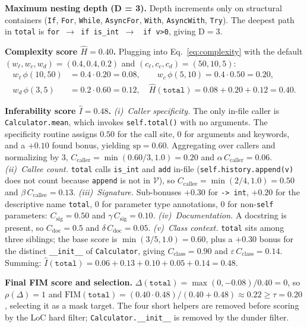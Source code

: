 \textbf{Maximum nesting depth (D = 3).}
Depth increments only on structural containers (\texttt{If},
\texttt{For}, \texttt{While}, \texttt{AsyncFor}, \texttt{With},
\texttt{AsyncWith}, \texttt{Try}). The deepest path in
\texttt{total} is \texttt{for}~$\to$~\texttt{if is\_int}~$\to$~%
\texttt{if v>0}, giving $\mathrm{D}=3$.

\textbf{Complexity score $\hat{H}=0.40$.}
Plugging into Eq.~\ref{eq:complexity} with the default
$(w_{\ell},w_{c},w_{d})=(0.4,0.4,0.2)$ and
$(c_{\ell},c_{c},c_{d})=(50,10,5)$:
\begin{align*}
w_{\ell}\,\phi(10,50) &= 0.4\!\cdot\!0.20 = 0.08, \qquad
w_{c}\,\phi(5,10)     = 0.4\!\cdot\!0.50 = 0.20, \\
w_{d}\,\phi(3,5)      &= 0.2\!\cdot\!0.60 = 0.12, \quad
\hat{H}(\texttt{total}) = 0.08+0.20+0.12 = 0.40.
\end{align*}

\textbf{Inferability score $\hat{I}=0.48$.}
\emph{(i)~Caller specificity.} The only in-file caller is
\texttt{Calculator.mean}, which invokes \texttt{self.total()} with no
arguments. The specificity routine assigns $0.50$ for the call site,
$0$ for arguments and keywords, and a $+0.10$ found bonus, yielding
$\mathrm{sp}=0.60$. Aggregating over callers and normalizing by $3$,
$C_{\mathrm{caller}}=\min(0.60/3,1.0)=0.20$ and
$\alpha\,C_{\mathrm{caller}}=0.06$.
\emph{(ii)~Callee count.} \texttt{total} calls \texttt{is\_int} and
\texttt{add} in-file (\texttt{self.history.append(v)} does not count
because \texttt{append} is not in $\mathcal{V}$), so
$C_{\mathrm{callee}}=\min(2/4,1.0)=0.50$ and
$\beta\,C_{\mathrm{callee}}=0.13$.
\emph{(iii)~Signature.} Sub-bonuses $+0.30$ for \texttt{-> int},
$+0.20$ for the descriptive name \texttt{total}, $0$ for parameter type
annotations, $0$ for non-\texttt{self} parameters: $C_{\mathrm{sig}}=0.50$
and $\gamma\,C_{\mathrm{sig}}=0.10$.
\emph{(iv)~Documentation.} A docstring is present, so
$C_{\mathrm{doc}}=0.5$ and $\delta\,C_{\mathrm{doc}}=0.05$.
\emph{(v)~Class context.} \texttt{total} sits among three siblings;
the base score is $\min(3/5,1.0)=0.60$, plus a $+0.30$ bonus for the
distinct \texttt{\_\_init\_\_} of \texttt{Calculator}, giving
$C_{\mathrm{class}}=0.90$ and $\varepsilon\,C_{\mathrm{class}}=0.14$.
Summing: $\hat{I}(\texttt{total})=0.06+0.13+0.10+0.05+0.14=0.48$.

\textbf{Final FIM score and selection.}
$\Delta(\texttt{total})=\max(0,-0.08)/0.40=0$, so
$\rho(\Delta)=1$ and
$\mathrm{FIM}(\texttt{total})=(0.40\!\cdot\!0.48)/(0.40\!+\!0.48)\approx 0.22 \geq \tau\!=\!0.20$,
selecting it as a mask target. The four short helpers are removed before
scoring by the LoC hard filter; \texttt{Calculator.\_\_init\_\_} is
removed by the dunder filter.

